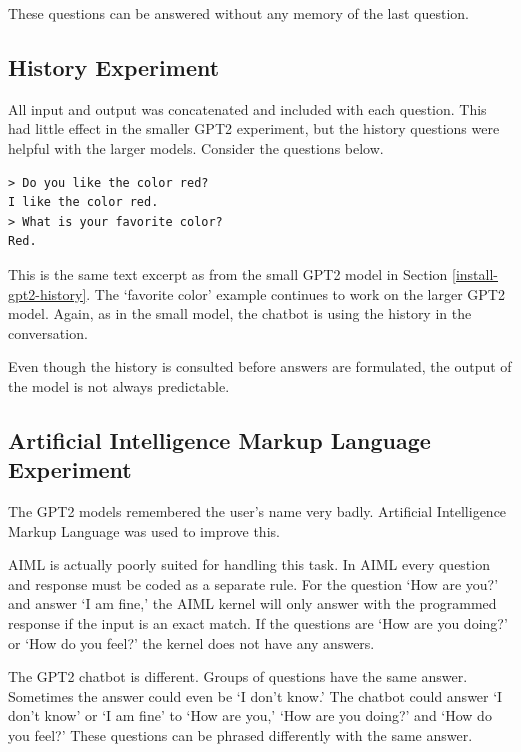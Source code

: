 These questions can be answered without any memory of the last question.

\subsection{History Experiment}

All input and output was concatenated and included with each question. This had little effect in the smaller GPT2 experiment, but the history questions were helpful with the larger models. Consider the questions below.
\begin{verbatim}
> Do you like the color red?
I like the color red.
> What is your favorite color?
Red.
\end{verbatim}
This is the same text excerpt as from the small GPT2 model in Section \ref{install-gpt2-history}. The `favorite color' example continues to work on the larger GPT2 model. Again, as in the small model, the chatbot is using the history in the conversation. 

Even though the history is consulted before answers are formulated, the output of the model is not always predictable. %


\subsection{Artificial Intelligence Markup Language Experiment}

The GPT2 models remembered the user's name very badly. %
Artificial Intelligence Markup Language was used to improve this. 

AIML is actually poorly suited for handling this task. In AIML every question and response must be coded as a separate rule. For the question `How are you?' and answer `I am fine,' the AIML kernel will only answer with the programmed response if the input is an exact match. If the questions are `How are you doing?' or `How do you feel?' the kernel does not have any answers. %

The GPT2 chatbot is different. Groups of questions have the same answer. Sometimes the answer could even be `I don't know.' The chatbot could answer `I don't know' or `I am fine' to  `How are you,'  `How are you doing?' and `How do you feel?' These questions can be phrased differently with the same answer.

